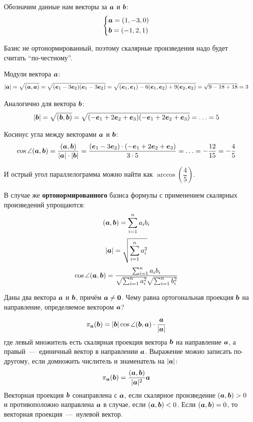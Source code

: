 \documentclass[a4paper,12pt]{article}
\begin{document}
  \begin{solution}
    Обозначим данные нам векторы за $\boldsymbol a$ и $\boldsymbol b$:
    \[
      \left\{
        \begin{aligned}
          &\boldsymbol a = (1, -3, 0)\\
          &\boldsymbol b = (-1, 2, 1)
        \end{aligned}
      \right.
    \]
    
    Базис не ортонормированный, поэтому скалярные произведения надо будет считать ``по-честному''.
    
    Модули вектора $\boldsymbol a$:
    \[
      |\boldsymbol a| = \sqrt{(\boldsymbol a, \boldsymbol a)} = \sqrt{(\boldsymbol e_1 - 3\boldsymbol e_2)(\boldsymbol e_1 - 3\boldsymbol e_2)}
        = \sqrt{(\boldsymbol e_1, \boldsymbol e_1) - 6(\boldsymbol e_1, \boldsymbol e_2) + 9(\boldsymbol e_2, \boldsymbol e_2)}
        = \sqrt{9 - 18 + 18} = 3
    \]
    
    Аналогично для вектора $\boldsymbol b$:
    \[
      |\boldsymbol b| = \sqrt{(\boldsymbol b, \boldsymbol b)} = \sqrt{(-\boldsymbol e_1 + 2\boldsymbol e_2 + \boldsymbol e_3)(-\boldsymbol e_1 + 2\boldsymbol e_2 + \boldsymbol e_3)}
        = \ldots = 5
    \]
    
    Косинус угла между векторами $\boldsymbol a$ и $\boldsymbol b$:
    \[
      \cos\angle(\boldsymbol a, \boldsymbol b) = \frac{(\boldsymbol a, \boldsymbol b)}{|\boldsymbol a| \cdot |\boldsymbol b|}
        = \frac{(\boldsymbol e_1 - 3\boldsymbol e_2) \cdot (-\boldsymbol e_1 + 2\boldsymbol e_2 + \boldsymbol e_3)}{3 \cdot 5}
        = \ldots = -\frac{12}{15} = -\frac{4}{5}
    \]
    
    И острый угол параллелограмма можно найти как $\arccos{\left(\dfrac{4}{5}\right)}$.
  \end{solution}
  
  В случае же \textbf{ортонормированного} базиса формулы с применением скалярных произведений упрощаются:
  \[
    (\boldsymbol a, \boldsymbol b) = \sum_{i=1}^n a_i b_i
  \]
  \[
    |\boldsymbol a| = \sqrt{\sum_{i=1}^n a_i^2}
  \]
  \[
    \cos\angle(\boldsymbol a, \boldsymbol b) = \frac{\sum_{i=1}^n a_i b_i}{\sqrt{\sum_{i=1}^n a_i^2} \sqrt{\sum_{i=1}^n b_i^2}}
  \]
  
  
  \begin{problem}[2.24]
    Даны два вектора $\boldsymbol a$ и $\boldsymbol b$, причём $\bds a \hm{\not=} \bds 0$.
    Чему равна ортогональная проекция $\boldsymbol b$ на направление, определяемое вектором $\boldsymbol a$?
  \end{problem}
  
  \begin{solution}
    \[
      \pi_{\boldsymbol a}(\boldsymbol b) = |\boldsymbol b| \cos\angle(\boldsymbol b, \boldsymbol a) \cdot \frac{\boldsymbol a}{|\boldsymbol a|}
    \]
    где левый множитель есть скалярная проекция вектора $\boldsymbol b$ на направление $\boldsymbol a$,
    а правый~---~единичный вектор в направлении $\boldsymbol a$.
    Выражение можно записать по-другому, если домножить числитель и знаменатель на $|\boldsymbol a|$:
    \[
      \pi_{\boldsymbol a}(\boldsymbol b) = \frac{(\boldsymbol a, \boldsymbol b)}{|\boldsymbol a|^2} \boldsymbol a
    \]
    Векторная проекция $\boldsymbol b$ сонаправлена с $\boldsymbol a$, если скалярное произведение $(\bds a, \bds b) \hm> 0$ и противоположно направлена $\boldsymbol a$ в случае, если $(\bds a, \bds b) \hm< 0$.
    Если $(\bds a, \bds b) \hm= 0$, то векторная проекция~---~нулевой вектор.
  \end{solution}
  
\end{document}
